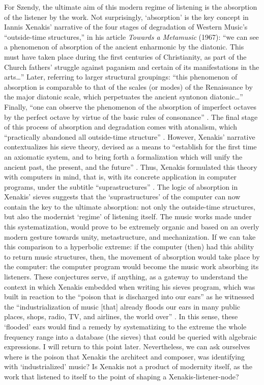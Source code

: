 For Szendy, the ultimate aim of this modern regime of listening is the absorption of the listener by the work. Not surprisingly, `absorption' is the key concept in Iannis Xenakis' narrative of the four stages of degradation of Western Music's ``outside-time structures,'' in his article \textit{Towards a Metamusic} (1967): ``we can see a phenomenon of absorption of the ancient enharmonic by the diatonic. This must have taken place during the first centuries of Christianity, as part of the Church fathers' struggle against paganism and certain of its manifestations in the arts\dots'' Later, referring to larger structural groupings: ``this phenomenon of absorption is comparable to that of the scales (or modes) of the Renaissance by the major diatonic scale, which perpetuates the ancient syntonon diatonic\dots'' Finally, ``one can observe the phenomenon of the absorption of imperfect octaves by the perfect octave by virtue of the basic rules of consonance'' \parencite[189-190]{Xen92:For}. The final stage of this process of absorption and degradation comes with atonalism, which ``practically abandoned all outside-time structure'' \parencite[193]{Xen92:For}. However, Xenakis' narrative contextualizes his sieve theory, devised as a means to ``establish for the first time an axiomatic system, and to bring forth a formalization which will unify the ancient past, the present, and the future'' \parencite[182]{Xen92:For}. Thus, Xenakis formulated this theory with computers in mind, that is, with its concrete application in computer programs, under the subtitle ``suprastructures'' \parencite[200]{Xen92:For}. The logic of absorption in Xenakis' sieves suggests that the `suprastructures' of the computer can now contain the key to the ultimate absorption: not only the outside-time structures, but also the modernist `regime' of listening itself. The music works made under this systematization, would prove to be extremely organic and based on an overly modern gesture towards unity, metastructure, and mechanization. If we can take this comparison to a hyperbolic extreme: if the computer (then) had this ability to return music structures, then, the movement of absorption would take place by the computer: the computer program would become the music work absorbing its listeners. These conjectures serve, if anything, as a gateway to understand the context in which Xenakis embedded when writing his sieves program, which was built in reaction to the ``poison that is discharged into our ears'' as he witnessed the ``industrialization of music [that] already floods our ears in many public places, shops, radio, TV, and airlines, the world over'' \parencite[200]{Xen92:For}. In this sense, these `flooded' ears would find a remedy by systematizing to the extreme the whole frequency range into a database (the sieves) that could be queried with algebraic expressions. I will return to this point later. Nevertheless, we can ask ourselves where is the poison that Xenakis the architect and composer, was identifying with `industrialized' music? Is Xenakis not a product of modernity itself, as the work that listened to itself to the point of shaping a Xenakis-listener-node? 


